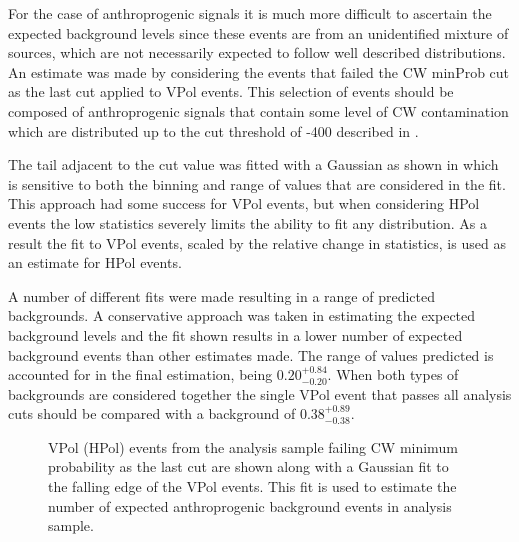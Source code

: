 For the case of anthroprogenic signals it is much more difficult to ascertain the expected background levels since these events are from an unidentified mixture of sources, which are not necessarily expected to follow well described distributions. An estimate was made by considering the events that failed the CW minProb cut as the last cut applied to VPol events. This selection of events should be composed of anthroprogenic signals that contain some level of CW contamination which are distributed up to the cut threshold of -400 described in . 

The tail adjacent to the cut value was fitted with a Gaussian as shown in  which is sensitive to both the binning and range of values that are considered in the fit. This approach had some success for VPol events, but when considering HPol events the low statistics severely limits the ability to fit any distribution. As a result the fit to VPol events, scaled by the relative change in statistics, is used as an estimate for HPol events.

A number of different fits were made resulting in a range of predicted backgrounds. A conservative approach was taken in estimating the expected background levels and the fit shown results in a lower number of expected background events than other estimates made. The range of values predicted is accounted for in the final estimation, being $0.20^{+0.84}_{-0.20}$. When both types of backgrounds are considered together the single VPol event that passes all analysis cuts should be compared with a background of $0.38^{+0.89}_{-0.38}$.


\begin{figure}[htpb]
\hfill
{}
\caption{VPol (HPol) events from the analysis sample failing CW minimum probability as the last cut are shown along with a Gaussian fit to the falling edge of the VPol events. This fit is used to estimate the number of expected anthroprogenic background events in analysis sample.}
\label{fig:Analysis:Background-Estimation:CW-Background}
\end{figure}
